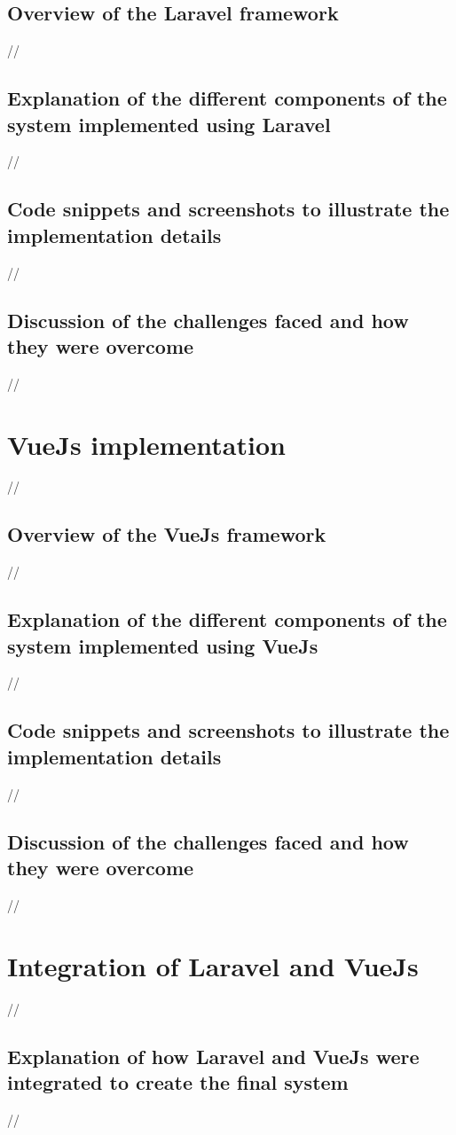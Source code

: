 \subsection {Overview of the Laravel framework}
//
\subsection {Explanation of the different components of the system implemented using Laravel}
//
\subsection {Code snippets and screenshots to illustrate the implementation details}
//
\subsection {Discussion of the challenges faced and how they were overcome}

//

\section {VueJs implementation}
//
\subsection {Overview of the VueJs framework}
//
\subsection {Explanation of the different components of the system implemented using VueJs}
//
\subsection {Code snippets and screenshots to illustrate the implementation details}
//
\subsection {Discussion of the challenges faced and how they were overcome}
//


\section {Integration of Laravel and VueJs}
//
\subsection {Explanation of how Laravel and VueJs were integrated to create the final system}
//

